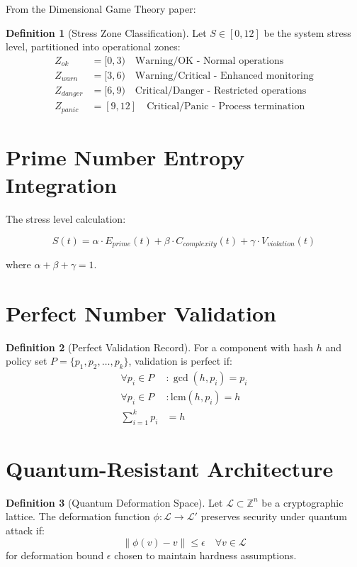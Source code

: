 \documentclass[12pt,a4paper]{report}
\theoremstyle{definition}
\newtheorem{definition}{Definition}[chapter]
\begin{document}
From the Dimensional Game Theory paper:

\begin{definition}[Stress Zone Classification]
Let $S \in [0, 12]$ be the system stress level, partitioned into operational zones:
\begin{align}
Z_{ok} &= [0, 3) \quad \text{Warning/OK - Normal operations} \\
Z_{warn} &= [3, 6) \quad \text{Warning/Critical - Enhanced monitoring} \\
Z_{danger} &= [6, 9) \quad \text{Critical/Danger - Restricted operations} \\
Z_{panic} &= [9, 12] \quad \text{Critical/Panic - Process termination}
\end{align}
\end{definition}

\section{Prime Number Entropy Integration}

The stress level calculation:

\begin{equation}
S(t) = \alpha \cdot E_{prime}(t) + \beta \cdot C_{complexity}(t) + \gamma \cdot V_{violation}(t)
\end{equation}

where $\alpha + \beta + \gamma = 1$.

\section{Perfect Number Validation}

\begin{definition}[Perfect Validation Record]
For a component with hash $h$ and policy set $P = \{p_1, p_2, \ldots, p_k\}$, validation is perfect if:
\begin{align}
\forall p_i \in P &: \gcd(h, p_i) = p_i \\
\forall p_i \in P &: \text{lcm}(h, p_i) = h \\
\sum_{i=1}^{k} p_i &= h
\end{align}
\end{definition}

\section{Quantum-Resistant Architecture}

\begin{definition}[Quantum Deformation Space]
Let $\mathcal{L} \subset \mathbb{Z}^n$ be a cryptographic lattice. The deformation function $\phi: \mathcal{L} \rightarrow \mathcal{L}'$ preserves security under quantum attack if:
$$\|\phi(v) - v\| \leq \epsilon \quad \forall v \in \mathcal{L}$$
for deformation bound $\epsilon$ chosen to maintain hardness assumptions.
\end{definition}
\end{document}
